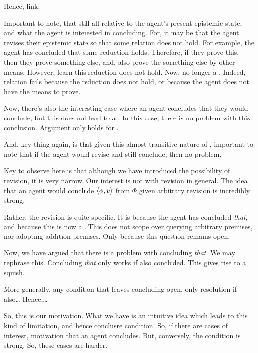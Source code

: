 \begin{note}
  Hence, link.

  Important to note, that still all relative to the agent's present epistemic state, and what the agent is interested in concluding.
  For, it may be that the agent revises their epistemic state so that some relation does not hold.
  For example, the agent has concluded that some reduction holds.
  Therefore, if they prove this, then they prove something else, and, also prove the something else by other means.
  However, learn this reduction does not hold.
  Now, no longer a \requ{}.
  Indeed, relation fails because the reduction does not hold, or because the agent does not have the means to prove.

  Now, there's also the interesting case where an agent concludes that they would conclude, but this does not lead to a \requ{}.
  In this case, there is no problem with this conclusion.
  Argument only holds for \requ{}.

  And, key thing again, is that given this almost-transitive nature of , important to note that if the agent would revise and still conclude, then no problem.
\end{note}

\begin{note}
  Key to observe here is that although we have introduced the possibility of revision, it is very narrow.
  Our interest is not with revision in general.
  The idea that an agent would conclude \(\langle \phi, v \rangle\) from \(\Phi\) given arbitrary revision is incredibly strong.

  Rather, the revision is quite specific.
  It is because the agent has concluded \emph{that}, and because this is now a \requ{}.
  This does not scope over querying arbitrary premises, nor adopting addition premises.
  Only because this question remains open.
\end{note}

\begin{note}
  Now, we have argued that there is a problem with concluding \emph{that}.
  We may rephrase this.
  Concluding \emph{that} only works if also concluded.
  This gives rise to a squish.

  More generally, any condition that leaves concluding open, only resolution if also\dots
  Hence,\dots
\end{note}

\begin{note}[Closure]
  So, this is our motivation.
  What we have is an intuitive idea which leads to this kind of limitation, and hence conclusre condition.
  So, if there are cases of interest, motivation that an agent concludes.
  But, conversely, the condition is strong.
  So, these cases are harder.
\end{note}


